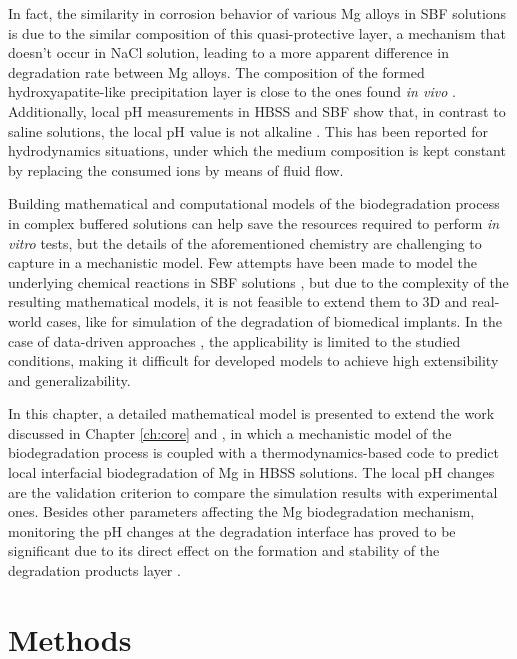 In fact, the similarity in corrosion behavior of various Mg alloys in \gls{SBF} solutions is due to the similar composition of this quasi-protective layer, a mechanism that doesn't occur in NaCl solution, leading to a more apparent difference in degradation rate between Mg alloys. The composition of the formed hydroxyapatite-like precipitation layer is close to the ones found \textit{in vivo} \cite{Mei2020}. Additionally, local pH measurements in \gls{HBSS} and \gls{SBF} show that, in contrast to saline solutions, the local pH value is not alkaline \cite{Lamaka2018,Mei2021}. This has been reported for hydrodynamics situations, under which the medium composition is kept constant by replacing the consumed ions by means of fluid flow.

Building mathematical and computational models of the biodegradation process in complex buffered solutions can help save the resources required to perform \textit{in vitro} tests, but the details of the aforementioned chemistry are challenging to capture in a mechanistic model. Few attempts have been made to model the underlying chemical reactions in \gls{SBF} solutions \cite{Hoche2014,Dolgikh2019,Zeller-Plumhoff2022}, but due to the complexity of the resulting mathematical models, it is not feasible to extend them to 3D and real-world cases, like for simulation of the degradation of biomedical implants. In the case of data-driven approaches \cite{Zeller-Plumhoff2021}, the applicability is limited to the studied conditions, making it difficult for developed models to achieve high extensibility and generalizability.

In this chapter, a detailed mathematical model is presented to extend the work discussed in Chapter \ref{ch:core} and \cite{Barzegari2021}, in which a mechanistic model of the biodegradation process is coupled with a thermodynamics-based code to predict local interfacial biodegradation of Mg in \gls{HBSS} solutions. The local pH changes are the validation criterion to compare the simulation results with experimental ones. Besides other parameters affecting the Mg biodegradation mechanism, monitoring the pH changes at the degradation interface has proved to be significant due to its direct effect on the formation and stability of the degradation products layer \cite{Gonzalez2021}.


\section{Methods}

